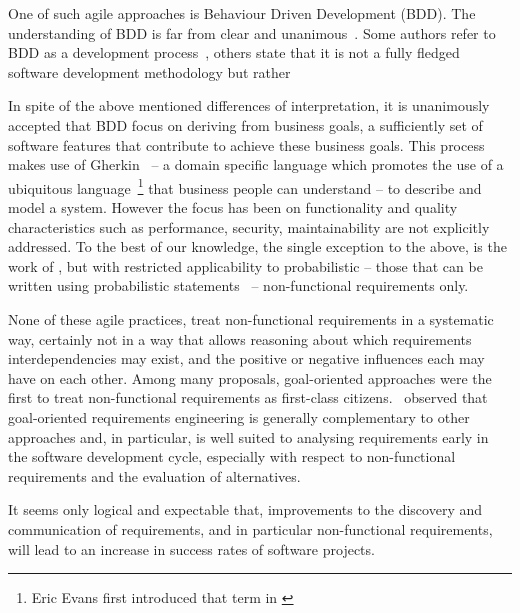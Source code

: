 \documentclass[dissertation,final]{softeng}
\begin{document}
One of such agile approaches is Behaviour Driven Development (BDD). The understanding of BDD is far from clear and unanimous~\citep{Solis0}. Some authors refer to BDD as a development process~\citep{Smart201410}, others state that it is not a fully fledged software development methodology but rather \emph{}

In spite of the above mentioned differences of interpretation, it is unanimously accepted that BDD focus on deriving from  business goals, a sufficiently set of software features that contribute to achieve these business goals. This process makes use of Gherkin~\citep{wynne2012cucumber} -- a domain specific language which promotes the use of a ubiquitous language~\footnote{ Eric Evans first introduced that term in  \citet{evans2004domain}}  that business people can understand -- to describe and model a system. However the focus has been on functionality and quality characteristics such as performance, security, maintainability are not explicitly addressed. To the best of our knowledge, the single exception to the above, is the work of \citet{barmi2011automated}, but with restricted applicability to probabilistic -- those that can be written using probabilistic statements~\citep{grunske2008specification} -- non-functional requirements only.

None of these agile practices, treat non-functional requirements in a systematic way, certainly not in a way that allows reasoning about which requirements interdependencies may exist, and the positive or negative influences each may have on each other. Among many proposals, goal-oriented approaches were the first to treat non-functional requirements as first-class citizens.~\citet{Mylopoulos:1999jh} observed that goal-oriented requirements engineering is generally complementary to other approaches and, in particular, is well suited to analysing requirements early in the software development cycle, especially with respect to non-functional requirements and the evaluation of alternatives. 

It seems only logical and expectable that, improvements to the discovery and communication of requirements, and in particular non-functional requirements, will lead to an increase in success rates of software projects.
\end{document}
